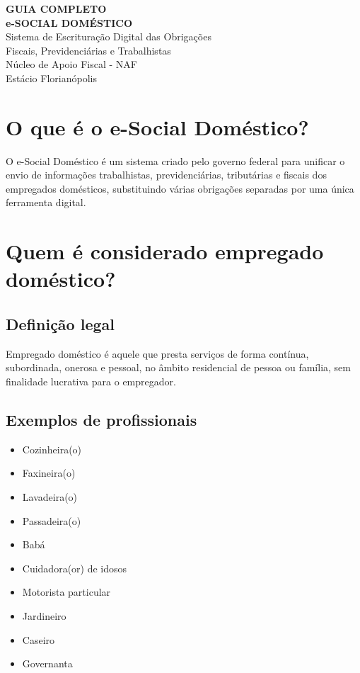\documentclass[12pt,a4paper]{article}
\begin{document}
\begin{center}
{\LARGE \textbf{GUIA COMPLETO}}\\[0.5cm]
{\Large \textbf{e-SOCIAL DOMÉSTICO}}\\[0.5cm]
{\large Sistema de Escrituração Digital das Obrigações}\\[0.3cm]
{\large Fiscais, Previdenciárias e Trabalhistas}\\[0.3cm]
{\large Núcleo de Apoio Fiscal - NAF}\\
{\large Estácio Florianópolis}\\[1cm]
\end{center}

\section{O que é o e-Social Doméstico?}

O e-Social Doméstico é um sistema criado pelo governo federal para unificar o envio de informações trabalhistas, previdenciárias, tributárias e fiscais dos empregados domésticos, substituindo várias obrigações separadas por uma única ferramenta digital.

\section{Quem é considerado empregado doméstico?}

\subsection{Definição legal}
Empregado doméstico é aquele que presta serviços de forma contínua, subordinada, onerosa e pessoal, no âmbito residencial de pessoa ou família, sem finalidade lucrativa para o empregador.

\subsection{Exemplos de profissionais}
\begin{itemize}
    \item Cozinheira(o)
    \item Faxineira(o)
    \item Lavadeira(o)
    \item Passadeira(o)
    \item Babá
    \item Cuidadora(or) de idosos
    \item Motorista particular
    \item Jardineiro
    \item Caseiro
    \item Governanta
\end{itemize}
\end{document}

